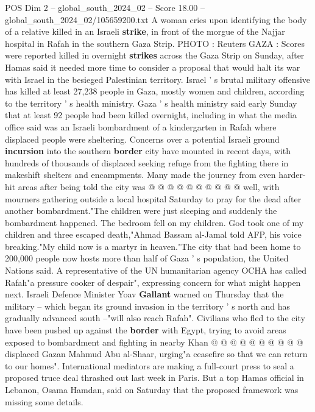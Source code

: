 \begin{textsample}{POS Dim 2 – global\_south\_2024\_02 – Score 18.00 – global\_south\_2024\_02/105659200.txt}  \label{ex:f2_pos_199}
A woman cries upon identifying the body of a relative killed in an Israeli \textbf{strike}, in front of the morgue of the Najjar hospital in Rafah in the southern Gaza Strip.
PHOTO : Reuters GAZA : Scores were reported killed in overnight \textbf{strikes} across the Gaza Strip on Sunday, after Hamas said it needed more time to consider a proposal that would halt its war with Israel in the besieged Palestinian territory.
Israel ' s brutal military offensive has killed at least 27,238 people in Gaza, mostly women and children, according to the territory ' s health ministry.
Gaza ' s health ministry said early Sunday that at least 92 people had been killed overnight, including in what the media office said was an Israeli bombardment of a kindergarten in Rafah where displaced people were sheltering.
Concerns over a potential Israeli ground \textbf{incursion} into the southern \textbf{border} city have mounted in recent days, with hundreds of thousands of displaced seeking refuge from the fighting there in makeshift shelters and encampments.
Many made the journey from even harder-hit areas after being told the city was @ @ @ @ @ @ @ @ @ @ well, with mourners gathering outside a local hospital Saturday to pray for the dead after another bombardment."The children were just sleeping and suddenly the bombardment happened.
The bedroom fell on my children.
God took one of my children and three escaped death,"Ahmad Bassam al-Jamal told AFP, his voice breaking."My child now is a martyr in heaven."The city that had been home to 200,000 people now hosts more than half of Gaza ' s population, the United Nations said.
A representative of the UN humanitarian agency OCHA has called Rafah"a pressure cooker of despair", expressing concern for what might happen next.
Israeli Defence Minister Yoav \textbf{Gallant} warned on Thursday that the military -- which began its ground invasion in the territory ' s north and has gradually advanced south --"will also reach Rafah".
Civilians who fled to the city have been pushed up against the \textbf{border} with Egypt, trying to avoid areas exposed to bombardment and fighting in nearby Khan @ @ @ @ @ @ @ @ @ @ displaced Gazan Mahmud Abu al-Shaar, urging"a ceasefire so that we can return to our homes".
International mediators are making a full-court press to seal a proposed truce deal thrashed out last week in Paris.
But a top Hamas official in Lebanon, Osama Hamdan, said on Saturday that the proposed framework was missing some details.

\end{textsample}
